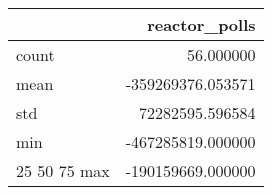 \begin{tabular}{lr}
\toprule
 & reactor\_polls \\
\midrule
count & 56.000000 \\
mean & -359269376.053571 \\
std & 72282595.596584 \\
min & -467285819.000000 \\
25%
50%
75%
max & -190159669.000000 \\
\bottomrule
\end{tabular}

